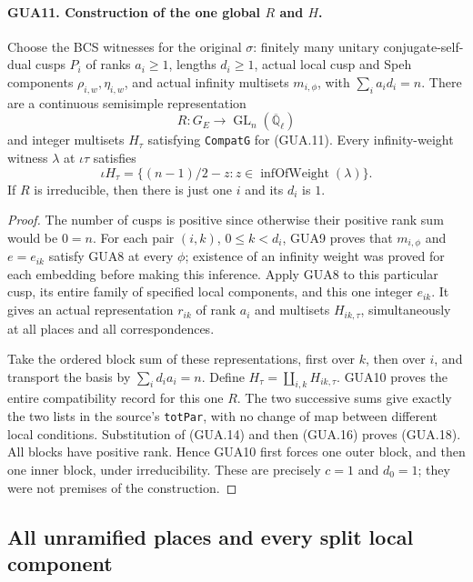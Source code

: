 \documentclass[11pt,a4paper]{article}
\numberwithin{equation}{section}
\theoremstyle{remark}\newtheorem{remark}[theorem]{Remark}
\begin{document}
\paragraph{GUA11. Construction of the one global $R$ and $H$.}
\label{claim:GUA11}
Choose the BCS witnesses for the original $\sigma$:
finitely many unitary conjugate-self-dual cusps $P_i$
of ranks $a_i\geq1$, lengths $d_i\geq1$, actual
local cusp and Speh components $\rho_{i,w},\eta_{i,w}$,
and actual infinity multisets $m_{i,\phi}$, with
$\sum_i a_i d_i=n$.  There are a continuous semisimple
representation
\[
           R:G_E\longrightarrow\operatorname{GL}_n(
                                  \overline{\mathbb Q}_\ell)
\]
and integer multisets $H_\tau$ satisfying
\texttt{Compat\allowbreak G} for (GUA.11).  Every infinity-weight
witness $\lambda$ at $\iota\tau$ satisfies
\[
 \iota H_\tau
       =\{(n-1)/2-z:z\in\operatorname{infOfWeight}(\lambda)\}.
                                                        \tag{GUA.18}
\]
If $R$ is irreducible, then there is just one $i$ and
its $d_i$ is $1$.
\begin{proof}
The number of cusps is positive since otherwise their
positive rank sum would be $0=n$.  For each pair $(i,k)$,
$0\leq k<d_i$, GUA9 proves that $m_{i,\phi}$ and
$e=e_{ik}$ satisfy GUA8 at every $\phi$; existence
of an infinity weight was proved for each embedding
before making this inference.  Apply GUA8 to this
particular cusp, its entire family of specified local
components, and this one integer $e_{ik}$.  It gives
an actual representation $r_{ik}$ of rank $a_i$ and
multisets $H_{ik,\tau}$, simultaneously at all places
and all correspondences.

Take the ordered block sum of these representations,
first over $k$, then over $i$, and transport the basis
by $\sum_i d_i a_i=n$.  Define
$H_\tau=\coprod_{i,k}H_{ik,\tau}$.  GUA10 proves
the entire compatibility record for this one $R$.
The two successive sums give exactly the two lists in
the source's \texttt{tot\allowbreak Par}, with no change of map
between different local conditions.  Substitution of
(GUA.14) and then (GUA.16) proves (GUA.18).
All blocks have positive rank.  Hence GUA10 first
forces one outer block, and then one inner block,
under irreducibility.  These are precisely $c=1$
and $d_0=1$; they were not premises of the construction.
\end{proof}

\subsection{All unramified places and every split local component}
\end{document}
